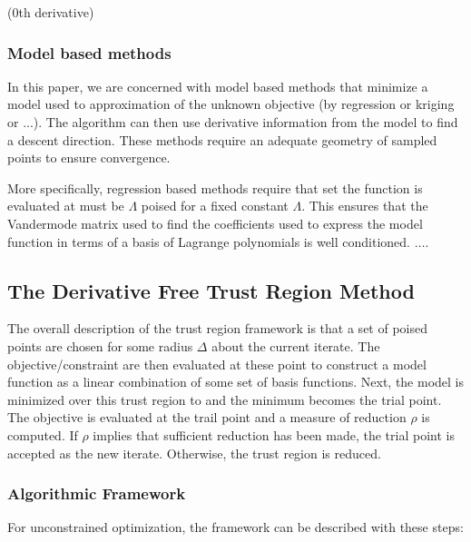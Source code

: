 \documentclass{article}
\begin{document}
(0th derivative)

\subsubsection{Model based methods}
In this paper, we are concerned with model based methods that minimize a model used to approximation of the unknown objective (by regression or kriging or ...).
The algorithm can then use derivative information from the model to find a descent direction.
These methods require an adequate geometry of sampled points to ensure convergence.

More specifically, regression based methods require that set the function is evaluated at must be $\Lambda$ poised for a fixed constant $\Lambda$.
This ensures that the Vandermode matrix used to find the coefficients used to express the model function in terms of a basis of Lagrange polynomials is well conditioned.
$\dots$.




\subsection{The Derivative Free Trust Region Method}

The overall description of the trust region framework is that a set of poised points are chosen for some radius $\Delta$ about the current iterate.
The objective/constraint are then evaluated at these point to construct a model function as a linear combination of some set of basis functions.
Next, the model is minimized over this trust region to and the minimum becomes the trial point.
The objective is evaluated at the trail point and a measure of reduction $\rho$ is computed.
If $\rho$ implies that sufficient reduction has been made, the trial point is accepted as the new iterate.
Otherwise, the trust region is reduced.

\subsubsection{Algorithmic Framework}

For unconstrained optimization, the framework can be described with these steps:
\end{document}

